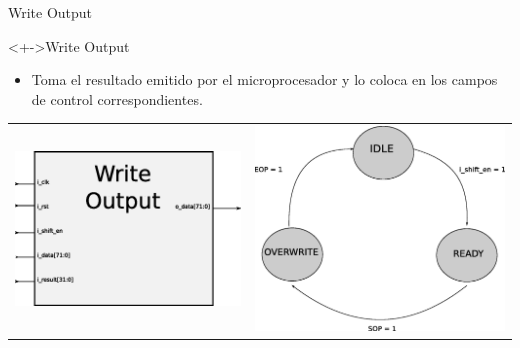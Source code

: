 \documentclass[xcolor=dvipsnames]{beamer}
\begin{document}
\begin{frame}{Write Output}
 \begin{block}<+->{Write Output}
	\begin{itemize}
      \scriptsize
	\item Toma el resultado emitido por el microprocesador y lo coloca en los campos de control correspondientes.	
	   \end{itemize}
	   \center 
 \begin{tabularx}{\linewidth}{Z|Z}
    \includegraphics[scale=0.40]{figures/bloqwrite.eps} 
    &
    \includegraphics[scale=0.25]{figures/estwritecompleto.eps}
    \\
  \end{tabularx}
\end{block}
\end{frame}
\end{document}
